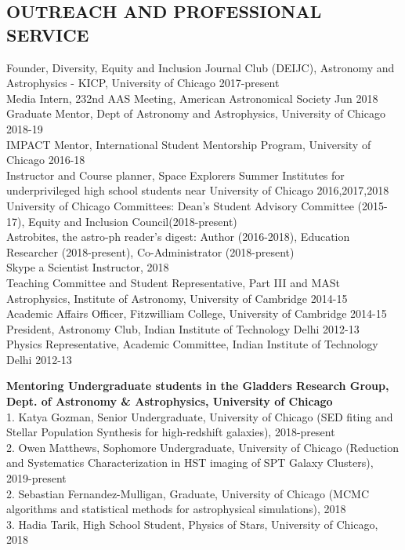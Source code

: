 \documentclass[margin]{res}
\begin{document}
\begin{resume}
\section{OUTREACH AND PROFESSIONAL SERVICE}
Founder, Diversity, Equity and Inclusion Journal Club (DEIJC), Astronomy and Astrophysics - KICP, University of Chicago \hfill 2017-present\\
Media Intern, 232nd AAS Meeting, American Astronomical Society \hfill Jun 2018\\
Graduate Mentor, Dept of Astronomy and Astrophysics, University of Chicago \hfill 2018-19\\
IMPACT Mentor, International Student Mentorship Program, University of Chicago \hfill 2016-18\\
Instructor and Course planner, Space Explorers Summer Institutes for underprivileged high school students near University of Chicago \hfill 2016,2017,2018\\
University of Chicago Committees: Dean's Student Advisory Committee (2015-17), Equity and Inclusion Council(2018-present)\\
Astrobites, the astro-ph reader's digest: Author (2016-2018), Education Researcher (2018-present), Co-Administrator (2018-present)\\
Skype a Scientist Instructor, 2018 \\
Teaching Committee and Student Representative, Part III and MASt Astrophysics, Institute of Astronomy, University of Cambridge \hfill 2014-15\\
Academic Affairs Officer, Fitzwilliam College, University of Cambridge \hfill 2014-15\\
President, Astronomy Club, Indian Institute of Technology Delhi \hfill 2012-13\\
Physics Representative, Academic Committee, Indian Institute of Technology Delhi \hfill 2012-13

\textbf{Mentoring Undergraduate students in the Gladders Research Group, Dept. of Astronomy \& Astrophysics, University of Chicago}\\
1. Katya Gozman, Senior Undergraduate, University of Chicago (SED fiting and Stellar Population Synthesis for high-redshift galaxies), 2018-present\\
2. Owen Matthews, Sophomore Undergraduate, University of Chicago (Reduction and Systematics Characterization in HST imaging of SPT Galaxy Clusters), 2019-present\\ 
2. Sebastian Fernandez-Mulligan, Graduate, University of Chicago (MCMC algorithms and statistical methods for astrophysical simulations), 2018\\
3. Hadia Tarik, High School Student, Physics of Stars, University of Chicago, 2018


\end{resume}
\end{document}
